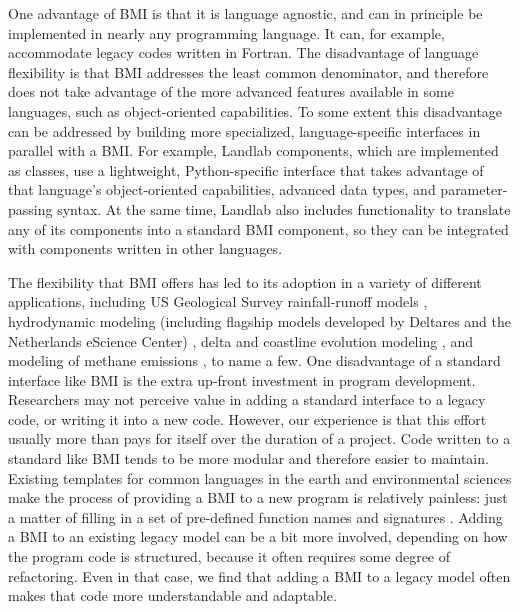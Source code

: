 \documentclass[12pt]{amsart}
\begin{document}
One advantage of BMI is that it is language agnostic, and can in principle be implemented in nearly any programming language. It can, for example, accommodate legacy codes written in Fortran. The disadvantage of language flexibility is that BMI addresses the least common denominator, and therefore does not take advantage of the more advanced features available in some languages, such as object-oriented capabilities. To some extent this disadvantage can be addressed by building more specialized, language-specific interfaces in parallel with a BMI. For example, Landlab components, which are implemented as classes, use a lightweight, Python-specific interface that takes advantage of that language's object-oriented capabilities, advanced data types, and parameter-passing syntax. At the same time, Landlab also includes functionality to translate any of its components into a standard BMI component, so they can be integrated with components written in other languages.

The flexibility that BMI offers has led to its adoption in a variety of different applications, including US Geological Survey rainfall-runoff models \citep{markstrom2015prms,regan2018description,regan2019us}, hydrodynamic modeling (including flagship models developed by Deltares and the Netherlands eScience Center) \citep{hoch2019advancing,hoch2019evaluating}, delta and coastline evolution modeling \citep{ratliff2018exploring}, and modeling of methane emissions \citep{fox2020agent}, to name a few. One disadvantage of a standard interface like BMI is the extra up-front investment in program development. Researchers may not perceive value in adding a standard interface to a legacy code, or writing it into a new code. However, our experience is that this effort usually more than pays for itself over the duration of a project. Code written to a standard like BMI tends to be more modular and therefore easier to maintain. Existing templates for common languages in the earth and environmental sciences make the process of providing a BMI to a new program is relatively painless: just a matter of filling in a set of pre-defined function names and signatures \citep{hutton2020basic}. Adding a BMI to an existing legacy model can be a bit more involved, depending on how the program code is structured, because it often requires some degree of refactoring. Even in that case, we find that adding a BMI to a legacy model often makes that code more understandable and adaptable.
\end{document}
